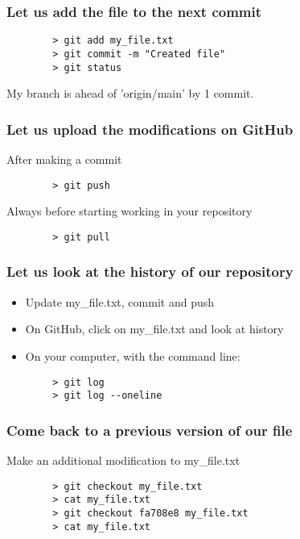 \documentclass{beamer}
\begin{document}
	\begin{frame}[fragile]
	\frametitle{Let us add the file to the next commit}
	\begin{exampleblock}{}
		\begin{verbatim}
		> git add my_file.txt 
		> git commit -m "Created file"
		> git status
		\end{verbatim}
	\end{exampleblock}
	My branch is ahead of 'origin/main' by 1 commit.
	\end{frame}

	\begin{frame}[fragile]
	\frametitle{Let us upload the modifications on GitHub}
	After making a commit
	\begin{exampleblock}{}
		\begin{verbatim}
		> git push
		\end{verbatim}
	\end{exampleblock}

	\vspace{0.5cm}

	Always before starting working in your repository
	\begin{exampleblock}{}
		\begin{verbatim}
		> git pull
		\end{verbatim}
	\end{exampleblock}
	\end{frame}

	\begin{frame}[fragile]
	\frametitle{Let us look at the history of our repository}
	\begin{itemize}
	\setlength\itemsep{1em}
		\item Update my\_file.txt, commit and push
		\item On GitHub, click on my\_file.txt and look at history
		\item On your computer, with the command line:
	\end{itemize}
	\begin{exampleblock}{}
		\begin{verbatim}
		> git log
		> git log --oneline
		\end{verbatim}
	\end{exampleblock}
	\end{frame}

	\begin{frame}[fragile]
	\frametitle{Come back to a previous version of our file}
	Make an additional modification to my\_file.txt

	\vspace{0.5cm}

	\begin{exampleblock}{}
		\begin{verbatim}
		> git checkout my_file.txt
		> cat my_file.txt
		> git checkout fa708e8 my_file.txt
		> cat my_file.txt
		\end{verbatim}
	\end{exampleblock}
	\end{frame}
\end{document}
